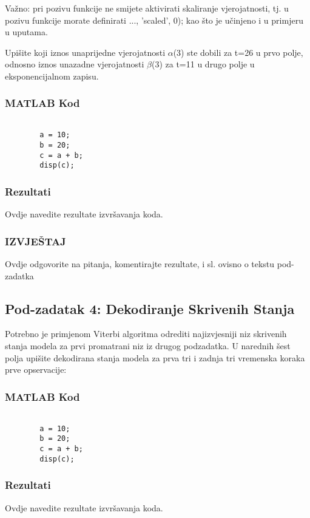 \documentclass[12pt]{article}
\begin{document}
	Važno: pri pozivu funkcije ne smijete aktivirati skaliranje vjerojatnosti, tj. u pozivu funkcije morate definirati ..., 'scaled', 0); kao što je učinjeno i u primjeru u uputama.
	
	Upišite koji iznos unaprijedne vjerojatnosti $\alpha$(3) ste dobili za t=26 u prvo polje, odnosno iznos unazadne vjerojatnosti $\beta$(3) za t=11 u drugo polje u eksponencijalnom zapisu.
	
	\subsubsection*{MATLAB Kod}
	\begin{lstlisting}
		
		a = 10;
		b = 20;
		c = a + b;
		disp(c);
	\end{lstlisting}
	
	\subsubsection*{Rezultati}
	Ovdje navedite rezultate izvršavanja koda.
	
	\subsubsection*{IZVJEŠTAJ}
	Ovdje odgovorite na pitanja, komentirajte rezultate, i sl. ovisno o tekstu pod-zadatka
	
	\subsection{Pod-zadatak 4: Dekodiranje Skrivenih Stanja}
	Potrebno je primjenom Viterbi algoritma odrediti najizvjesniji niz skrivenih stanja modela za prvi promatrani niz iz drugog podzadatka. U narednih šest polja upišite dekodirana stanja modela za prva tri i zadnja tri vremenska koraka prve opservacije:
	
	\subsubsection*{MATLAB Kod}
	\begin{lstlisting}
		
		a = 10;
		b = 20;
		c = a + b;
		disp(c);
	\end{lstlisting}
	
	\subsubsection*{Rezultati}
	Ovdje navedite rezultate izvršavanja koda.
	
\end{document}
